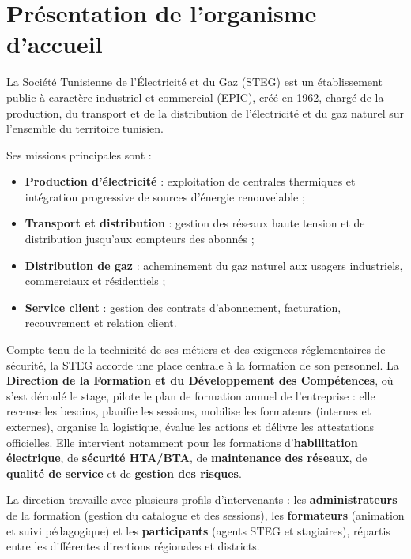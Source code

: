 \documentclass[12pt,a4paper,oneside,openany]{report}
\begin{document}
\section{Présentation de l'organisme d'accueil}

La Société Tunisienne de l'Électricité et du Gaz (STEG) est un établissement public à caractère industriel et commercial (EPIC), créé en 1962, chargé de la production, du transport et de la distribution de l'électricité et du gaz naturel sur l'ensemble du territoire tunisien.

Ses missions principales sont :
\begin{itemize}
    \item \textbf{Production d'électricité} : exploitation de centrales thermiques et intégration progressive de sources d'énergie renouvelable ;
    \item \textbf{Transport et distribution} : gestion des réseaux haute tension et de distribution jusqu'aux compteurs des abonnés ;
    \item \textbf{Distribution de gaz} : acheminement du gaz naturel aux usagers industriels, commerciaux et résidentiels ;
    \item \textbf{Service client} : gestion des contrats d'abonnement, facturation, recouvrement et relation client.
\end{itemize}

Compte tenu de la technicité de ses métiers et des exigences réglementaires de sécurité, la STEG accorde une place centrale à la formation de son personnel. La \textbf{Direction de la Formation et du Développement des Compétences}, où s'est déroulé le stage, pilote le plan de formation annuel de l'entreprise : elle recense les besoins, planifie les sessions, mobilise les formateurs (internes et externes), organise la logistique, évalue les actions et délivre les attestations officielles. Elle intervient notamment pour les formations d'\textbf{habilitation électrique}, de \textbf{sécurité HTA/BTA}, de \textbf{maintenance des réseaux}, de \textbf{qualité de service} et de \textbf{gestion des risques}.

La direction travaille avec plusieurs profils d'intervenants : les \textbf{administrateurs} de la formation (gestion du catalogue et des sessions), les \textbf{formateurs} (animation et suivi pédagogique) et les \textbf{participants} (agents STEG et stagiaires), répartis entre les différentes directions régionales et districts.
\end{document}
